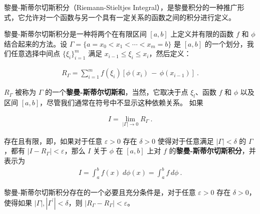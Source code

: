 
黎曼-斯蒂尔切斯积分（Riemann-Stieltjes Integral），是黎曼积分的一种推广形式，它允许对一个函数与另一个具有一定关系的函数之间的积分进行定义。

黎曼-斯蒂尔切斯积分是一种将两个在有限区间 $ [a, b] $ 上定义并有限的函数 $ f $ 和 $ \phi $ 结合起来的方法。设 $ \Gamma=\{a=x_{0}<x_{1}<\cdots<x_{m}=b\} $ 是 $ [a, b] $ 的一个划分，我们任意选择中间点 $ \{\xi_{i}\}_{i=1}^{m} $ 满足 $ x_{i-1}\leq\xi_{i}\leq x_{i} $，然后定义：

\begin{align}
R_{\Gamma}=\sum_{i=1}^{m}f(\xi_{i})[\phi(x_{i})\,-\,\phi(x_{i-1})]~.
\end{align}

$ R_{\Gamma} $ 被称为 $ \Gamma $ 的一个\textbf{黎曼-斯蒂尔切斯和}，当然，它取决于点 $ \xi_{l} $、函数 $ f $ 和 $ \phi $ 以及区间 $ [a, b] $，尽管我们通常在符号中不显示这种依赖关系。
如果

\begin{align}
I=\lim_{|\Gamma|\to0}R_{\Gamma}~.
\end{align}

存在且有限，即，如果对于任意 $ \varepsilon>0 $ 存在 $ \delta>0 $ 使得对于任意满足 $ |\Gamma|<\delta $ 的 $ \Gamma $，都有 $ |I-R_{\Gamma}|<\varepsilon $，那么 $ I $ 关于 $ \phi $ 在 $ [a, b] $ 上对 $ f $ 的\textbf{黎曼-斯蒂尔切斯积分}，并表示为
\begin{align}
I=\int_{a}^{b}\!f(x)\;d\phi(x)=\int_{a}^{b}\!f\,d\phi~.
\end{align}

黎曼-斯蒂尔切斯积分存在的一个必要且充分条件是，对于任意 $ \varepsilon>0 $ 存在 $ \delta>0 $，使得如果 $ |\Gamma|,|\Gamma^{\prime}|<\delta $，则 $ |R_{\Gamma}-R_{\Gamma}|<\varepsilon $。